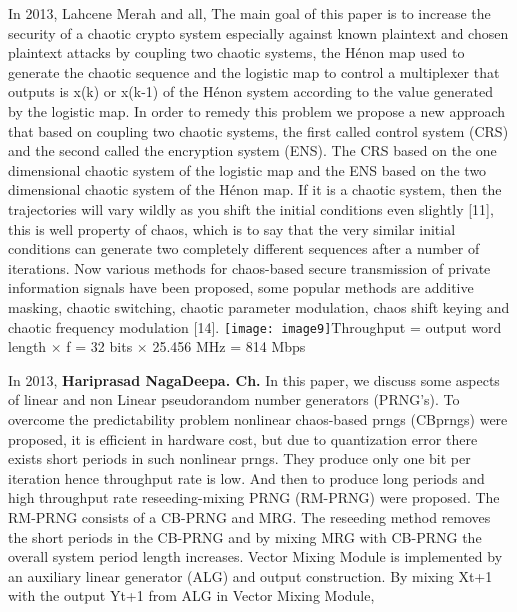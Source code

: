 In 2013, Lahcene Merah and all, The main goal of this paper is to increase the security of a chaotic crypto system especially against known plaintext and chosen plaintext attacks by coupling two chaotic systems, the Hénon map used to generate the chaotic sequence and the logistic map to control a multiplexer that outputs is x(k) or x(k-1) of the Hénon system according to the value generated by the logistic map. In order to remedy this problem we propose a new approach that based on coupling two chaotic systems, the first called control system (CRS) and the second called the encryption system (ENS). The CRS based on the one dimensional chaotic system of the logistic map and the ENS based on the two dimensional chaotic system of the Hénon map. If it is a chaotic system, then the trajectories will vary wildly as you shift the initial conditions even slightly [11], this is well property of chaos, which is to say that the very similar initial conditions can generate two completely different sequences after a number of iterations. Now various methods for chaos-based secure transmission of private information signals have been proposed, some popular methods are additive masking, chaotic switching, chaotic parameter modulation, chaos shift keying and chaotic frequency modulation [14].  \texttt{[image: image9]}Throughput = output word length $\times$ f  = 32 bits $\times$ 25.456 MHz = 814 Mbps\textbf{\textit{\underbar{}}}

In 2013, \textbf{Hariprasad  NagaDeepa. Ch.  }In this paper, we discuss some aspects of linear and non Linear pseudorandom number generators (PRNG's). To overcome the predictability problem nonlinear chaos-based prngs (CBprngs) were proposed, it is efficient in hardware cost, but due to quantization error there exists short periods in such nonlinear prngs. They produce only one bit per iteration hence throughput rate is low. And then to produce long periods and high throughput rate reseeding-mixing PRNG (RM-PRNG) were proposed. The RM-PRNG consists of a CB-PRNG and MRG. The reseeding method removes the short periods in the CB-PRNG and by mixing MRG with CB-PRNG the overall system period length increases. Vector Mixing Module is implemented by an auxiliary linear generator (ALG) and output construction. By mixing Xt+1 with the output Yt+1 from ALG in Vector Mixing Module, 

